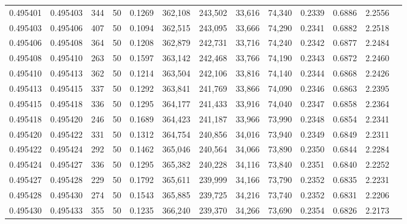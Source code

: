 \begin{tabular}{rrrrrrrrrrrrr}
0.495401 & 0.495403 &   344 &  50 &                                     0.1269 & 362,108 & 243,502 &  33,616 &  74,340 & 0.2339 & 0.6886 & 2.2556 \\
0.495403 & 0.495406 &   407 &  50 &                                     0.1094 & 362,515 & 243,095 &  33,666 &  74,290 & 0.2341 & 0.6882 & 2.2518 \\
0.495406 & 0.495408 &   364 &  50 &                                     0.1208 & 362,879 & 242,731 &  33,716 &  74,240 & 0.2342 & 0.6877 & 2.2484 \\
0.495408 & 0.495410 &   263 &  50 &                                     0.1597 & 363,142 & 242,468 &  33,766 &  74,190 & 0.2343 & 0.6872 & 2.2460 \\
0.495410 & 0.495413 &   362 &  50 &                                     0.1214 & 363,504 & 242,106 &  33,816 &  74,140 & 0.2344 & 0.6868 & 2.2426 \\
0.495413 & 0.495415 &   337 &  50 &                                     0.1292 & 363,841 & 241,769 &  33,866 &  74,090 & 0.2346 & 0.6863 & 2.2395 \\
0.495415 & 0.495418 &   336 &  50 &                                     0.1295 & 364,177 & 241,433 &  33,916 &  74,040 & 0.2347 & 0.6858 & 2.2364 \\
0.495418 & 0.495420 &   246 &  50 &                                     0.1689 & 364,423 & 241,187 &  33,966 &  73,990 & 0.2348 & 0.6854 & 2.2341 \\
0.495420 & 0.495422 &   331 &  50 &                                     0.1312 & 364,754 & 240,856 &  34,016 &  73,940 & 0.2349 & 0.6849 & 2.2311 \\
0.495422 & 0.495424 &   292 &  50 &                                     0.1462 & 365,046 & 240,564 &  34,066 &  73,890 & 0.2350 & 0.6844 & 2.2284 \\
0.495424 & 0.495427 &   336 &  50 &                                     0.1295 & 365,382 & 240,228 &  34,116 &  73,840 & 0.2351 & 0.6840 & 2.2252 \\
0.495427 & 0.495428 &   229 &  50 &                                     0.1792 & 365,611 & 239,999 &  34,166 &  73,790 & 0.2352 & 0.6835 & 2.2231 \\
0.495428 & 0.495430 &   274 &  50 &                                     0.1543 & 365,885 & 239,725 &  34,216 &  73,740 & 0.2352 & 0.6831 & 2.2206 \\
0.495430 & 0.495433 &   355 &  50 &                                     0.1235 & 366,240 & 239,370 &  34,266 &  73,690 & 0.2354 & 0.6826 & 2.2173 \\

\end{tabular}
